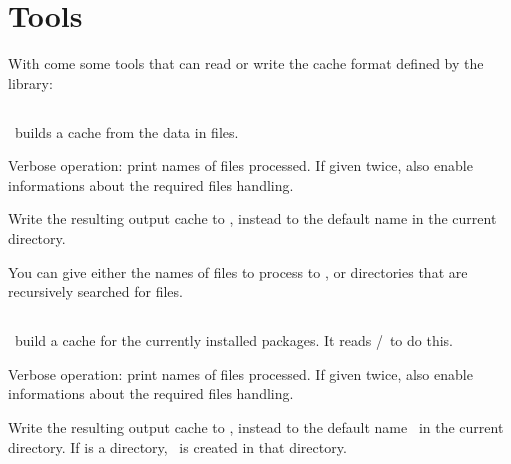 \documentclass[10pt]{article}
\begin{document}

\section{Tools}

With  come some tools that can read or write the cache
format defined by the library:


\subsection{\MKSUMPROG}

\MKSUMPROG\ builds a cache from the data in  files.

Verbose operation: print names of files processed. If given twice,
also enable informations about the required files handling.

Write the resulting output cache to , instead to the
default name \INFOFILENAME in the current directory.

You can give either the names of  files to process to
\MKSUMPROG, or directories that are recursively searched for
 files.

\endsynopsis


\subsection{\ICACHEPROG}

\ICACHEPROG\ build a cache for the currently installed packages. It
reads \RPMLIBPATH\slash\RPMDBFILENAME\ to do this.


Verbose operation: print names of files processed. If given twice,
also enable informations about the required files handling.

Write the resulting output cache to , instead to the
default name \ICACHEFILENAME\ in the current directory. If
 is a directory, \ICACHEFILENAME\ is created in
that directory.
\end{document}
